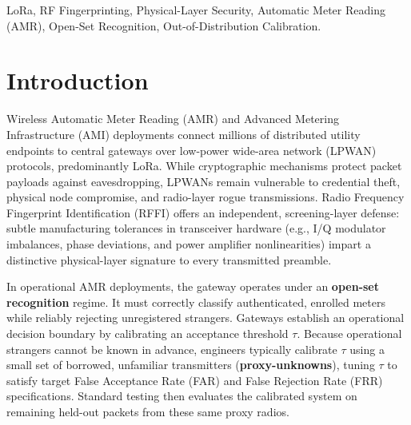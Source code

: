 \documentclass[conference]{IEEEtran}
\begin{document}
\begin{abstract}
A key negative result concerns the cost of mitigation: an identity-robust threshold ($\tau_{\text{robust}}$) reduces episode-mean true-stranger penetration from $11.90\%$ to $4.43\%$ (a $62.8\%$ reduction), but the False Rejection Rate surges from $8.49\%$ to $30.08\%$ (+21.59 pp, peaking at $84.63\%$)---rejecting nearly 1 in 3 legitimate meter packets, which is operationally unacceptable for battery-powered AMR networks. Temporal multi-packet burst fusion ($L=5$, evaluated at $\tau_{\text{Youden}}$) reduces legitimate meter false rejection to $3.54\%$ (availability $96.46\%$) while elevating open-set discrimination to $\text{AUROC} = 0.9670$. Device-mean $\text{FAR}_B$ ranges from $0.0\%$ to $65.7\%$ (device 48); single-episode device penetration reaches up to $100\%$, with 7 of the 8 hardest rogues clustering in a single hardware block. These findings establish that physical-layer authentication must be evaluated under identity-disjoint protocols with $\ge 5$ diverse proxy devices to avoid dangerously overestimating real-world protection.
\end{abstract}

\begin{IEEEkeywords}
LoRa, RF Fingerprinting, Physical-Layer Security, Automatic Meter Reading (AMR), Open-Set Recognition, Out-of-Distribution Calibration.
\end{IEEEkeywords}

\section{Introduction}
Wireless Automatic Meter Reading (AMR) and Advanced Metering Infrastructure (AMI) deployments connect millions of distributed utility endpoints to central gateways over low-power wide-area network (LPWAN) protocols, predominantly LoRa. While cryptographic mechanisms protect packet payloads against eavesdropping, LPWANs remain vulnerable to credential theft, physical node compromise, and radio-layer rogue transmissions. Radio Frequency Fingerprint Identification (RFFI) offers an independent, screening-layer defense: subtle manufacturing tolerances in transceiver hardware (e.g., I/Q modulator imbalances, phase deviations, and power amplifier nonlinearities) impart a distinctive physical-layer signature to every transmitted preamble.

In operational AMR deployments, the gateway operates under an \textbf{open-set recognition} regime. It must correctly classify authenticated, enrolled meters while reliably rejecting unregistered strangers. Gateways establish an operational decision boundary by calibrating an acceptance threshold $\tau$. Because operational strangers cannot be known in advance, engineers typically calibrate $\tau$ using a small set of borrowed, unfamiliar transmitters (\textbf{proxy-unknowns}), tuning $\tau$ to satisfy target False Acceptance Rate (FAR) and False Rejection Rate (FRR) specifications. Standard testing then evaluates the calibrated system on remaining held-out packets from these same proxy radios.
\end{document}
